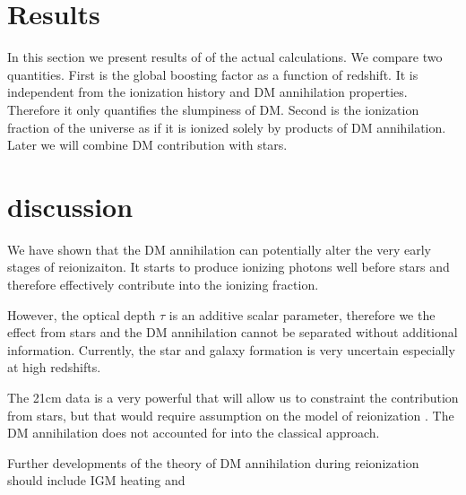 \section{Results}
\label{sec:results}

In this section we present results of of the actual calculations. We compare two quantities. First is the global boosting factor as a function of redshift. It is independent from the ionization history and DM annihilation properties. Therefore it only quantifies the slumpiness of DM. Second is the ionization fraction of the universe as if it is ionized solely by products of DM annihilation. Later we will combine DM contribution with stars.

\section{discussion}

We have shown that the DM annihilation can potentially alter the very early stages of reionizaiton. It starts to produce ionizing photons well before stars and therefore effectively contribute into the ionizing fraction. 

However, the optical depth $\tau$ is an additive scalar parameter, therefore we the effect from stars and the DM annihilation cannot be separated without additional information. Currently, the star and galaxy formation is very uncertain especially at high redshifts.

The 21cm data is a very powerful that will allow us to constraint the contribution from stars, but that would require assumption on the model of reionization \cite{2015arXiv150908463L}. The DM annihilation does not accounted for into the classical approach.

Further developments of the theory of DM annihilation during reionization should include IGM heating and 